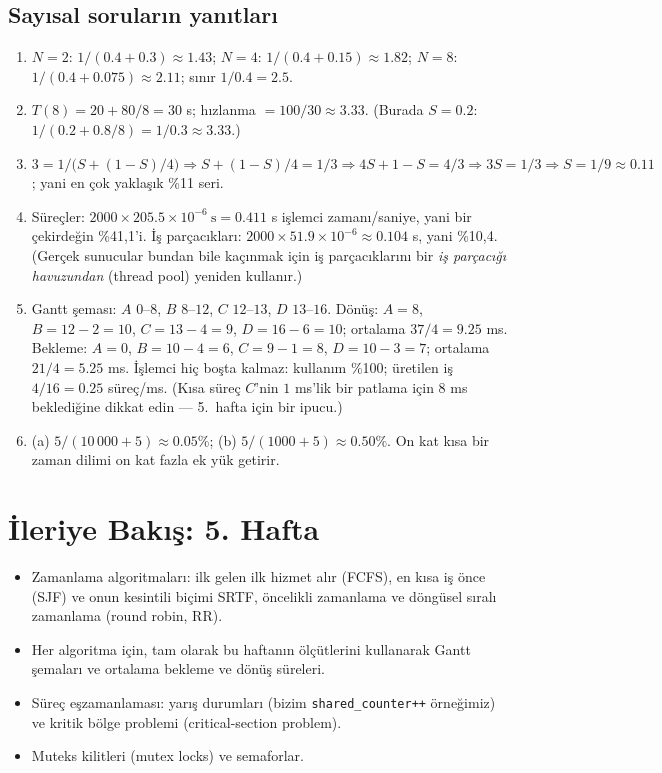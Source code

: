 \documentclass[11pt,a4paper]{article}
\newcommand{\cmd}[1]{\texttt{#1}}
\begin{document}
\subsection*{Sayısal soruların yanıtları}
\begin{enumerate}[leftmargin=1.6em,start=13]
  \item $N=2$: $1/(0.4 + 0.3) \approx 1.43$; $N=4$: $1/(0.4 + 0.15) \approx 1.82$; $N=8$: $1/(0.4 + 0.075) \approx 2.11$; sınır $1/0.4 = 2.5$.
  \item $T(8) = 20 + 80/8 = 30$ s; hızlanma $= 100/30 \approx 3.33$. (Burada $S = 0.2$: $1/(0.2 + 0.8/8) = 1/0.3 \approx 3.33$.)
  \item $3 = 1/\bigl(S + (1-S)/4\bigr) \Rightarrow S + (1-S)/4 = 1/3 \Rightarrow 4S + 1 - S = 4/3 \Rightarrow 3S = 1/3 \Rightarrow S = 1/9 \approx 0.11$; yani en çok yaklaşık \%11 seri.
  \item Süreçler: $2000 \times 205.5\times10^{-6}\ \text{s} = 0.411$ s işlemci zamanı/saniye, yani bir çekirdeğin \%41,1'i. İş parçacıkları: $2000 \times 51.9\times10^{-6} \approx 0.104$ s, yani \%10,4. (Gerçek sunucular bundan bile kaçınmak için iş parçacıklarını bir \emph{iş parçacığı havuzundan} (thread pool) yeniden kullanır.)
  \item Gantt şeması: $A$ $0$--$8$, $B$ $8$--$12$, $C$ $12$--$13$, $D$ $13$--$16$. Dönüş: $A = 8$, $B = 12-2 = 10$, $C = 13-4 = 9$, $D = 16-6 = 10$; ortalama $37/4 = 9.25$ ms. Bekleme: $A = 0$, $B = 10-4 = 6$, $C = 9-1 = 8$, $D = 10-3 = 7$; ortalama $21/4 = 5.25$ ms. İşlemci hiç boşta kalmaz: kullanım \%100; üretilen iş $4/16 = 0.25$ süreç/ms. (Kısa süreç $C$'nin $1$ ms'lik bir patlama için $8$ ms beklediğine dikkat edin --- 5.~hafta için bir ipucu.)
  \item (a) $5/(10\,000 + 5) \approx 0.05\%$; (b) $5/(1000 + 5) \approx 0.50\%$. On kat kısa bir zaman dilimi on kat fazla ek yük getirir.
\end{enumerate}

\section{İleriye Bakış: 5. Hafta}

\begin{itemize}
  \item Zamanlama algoritmaları: ilk gelen ilk hizmet alır (FCFS), en kısa iş önce (SJF) ve onun kesintili biçimi SRTF, öncelikli zamanlama ve döngüsel sıralı zamanlama (round robin, RR).
  \item Her algoritma için, tam olarak bu haftanın ölçütlerini kullanarak Gantt şemaları ve ortalama bekleme ve dönüş süreleri.
  \item Süreç eşzamanlaması: yarış durumları (bizim \cmd{shared\_counter++} örneğimiz) ve kritik bölge problemi (critical-section problem).
  \item Muteks kilitleri (mutex locks) ve semaforlar.
\end{itemize}
\end{document}
